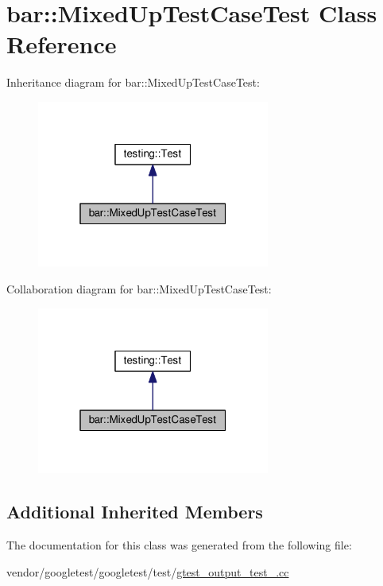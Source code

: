 \hypertarget{classbar_1_1MixedUpTestCaseTest}{}\section{bar\+:\+:Mixed\+Up\+Test\+Case\+Test Class Reference}
\label{classbar_1_1MixedUpTestCaseTest}


Inheritance diagram for bar\+:\+:Mixed\+Up\+Test\+Case\+Test\+:
\nopagebreak
\begin{figure}[H]
\begin{center}
\leavevmode
\includegraphics[width=217pt]{classbar_1_1MixedUpTestCaseTest__inherit__graph}
\end{center}
\end{figure}


Collaboration diagram for bar\+:\+:Mixed\+Up\+Test\+Case\+Test\+:
\nopagebreak
\begin{figure}[H]
\begin{center}
\leavevmode
\includegraphics[width=217pt]{classbar_1_1MixedUpTestCaseTest__coll__graph}
\end{center}
\end{figure}
\subsection*{Additional Inherited Members}


The documentation for this class was generated from the following file\+:\begin{DoxyCompactItemize}
\item 
vendor/googletest/googletest/test/\hyperlink{gtest__output__test___8cc}{gtest\+\_\+output\+\_\+test\+\_\+.\+cc}\end{DoxyCompactItemize}
